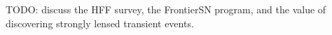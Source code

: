 TODO: discuss the HFF survey, the FrontierSN program, and the value of discovering strongly lensed transient events.   
  